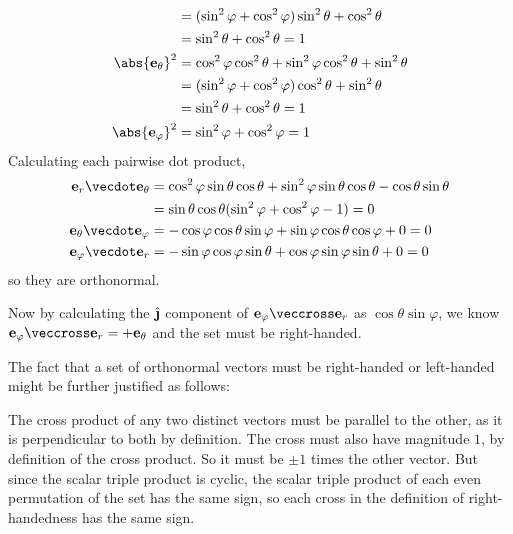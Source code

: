 \documentclass[fleqn,a4paper,11pt]{article}
\begin{document}
\begin{enumerate}
\begin{align*}
                      &= (\sin^2 \varphi + \cos^2 \varphi)\sin^2 \theta
                         + \cos^2 \theta \\
                      &= \sin^2 \theta + \cos^2 \theta = 1 \\
     \abs{\vec e_\theta}^2 &= \cos^2 \varphi \cos^2 \theta
                         + \sin^2 \varphi \cos^2 \theta + \sin^2 \theta \\
                      &= (\sin^2 \varphi + \cos^2 \varphi)\cos^2 \theta
                         + \sin^2 \theta \\
                      &= \sin^2 \theta + \cos^2 \theta = 1 \\
     \abs{\vec e_\varphi}^2 &= \sin^2 \varphi + \cos^2 \varphi = 1
    \end{align*}
    Calculating each pairwise dot product,
    \begin{align*}
     \vec e_r \vecdot \vec e_\theta &=
      \cos^2 \varphi \sin \theta \cos \theta
      + \sin^2 \varphi \sin \theta \cos \theta - \cos \theta \sin \theta \\
      &= \sin \theta \cos \theta(\sin^2 \varphi + \cos^2 \varphi - 1) = 0 \\
     \vec e_\theta \vecdot \vec e_\varphi &=
      -\cos \varphi \cos \theta \sin \varphi
      + \sin \varphi \cos \theta \cos \varphi + 0 = 0 \\
     \vec e_\varphi \vecdot \vec e_r &=
      -\sin \varphi \cos \varphi \sin \theta
      + \cos \varphi \sin \varphi \sin \theta + 0 = 0
    \end{align*}
    so they are orthonormal.

    Now by calculating the \(\uvecj\) component of
    \(\vec e_\varphi \veccross \vec e_r\) as
    \(\cos \theta \sin \varphi\), we know
    \(\vec e_\varphi \veccross \vec e_r = +\vec e_\theta\) and the set must be
    right-handed.

    The fact that a set of orthonormal vectors must be right-handed or
    left-handed might be further justified as follows:

    The cross product of any two distinct vectors must be parallel to the other,
    as it is perpendicular to both by definition. The cross must also have
    magnitude \(1\), by definition of the cross product. So it must be \(\pm 1\)
    times the other vector. But since the scalar triple product is cyclic, the
    scalar triple product of each even permutation of the set has the same sign,
    so each cross in the definition of right-handedness has the same sign.


\end{enumerate}
\end{document}
